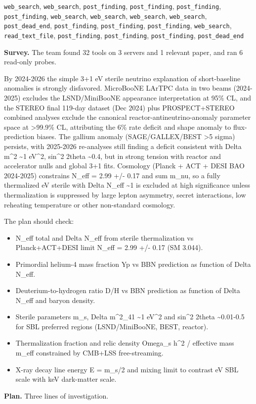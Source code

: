 \documentclass[11pt,a4paper]{article}
\begin{document}
\texttt{web\_search}, \texttt{web\_search}, \texttt{post\_finding}, \texttt{post\_finding}, \texttt{post\_finding}, \texttt{post\_finding}, \texttt{web\_search}, \texttt{web\_search}, \texttt{web\_search}, \texttt{web\_search}, \texttt{post\_dead\_end}, \texttt{post\_finding}, \texttt{post\_finding}, \texttt{post\_finding}, \texttt{web\_search}, \texttt{read\_text\_file}, \texttt{post\_finding}, \texttt{post\_finding}, \texttt{post\_finding}, \texttt{post\_dead\_end}\par
\textbf{Survey.} The team found 32 tools on 3 servers and 1 relevant paper, and ran 6 read-only probes.

By 2024-2026 the simple 3+1 eV sterile neutrino explanation of short-baseline anomalies is strongly disfavored. MicroBooNE LArTPC data in two beams (2024-2025) excludes the LSND/MiniBooNE appearance interpretation at 95\% CL, and the STEREO final 119-day dataset (Dec 2024) plus PROSPECT+STEREO combined analyses exclude the canonical reactor-antineutrino-anomaly parameter space at \textgreater{}99.9\% CL, attributing the 6\% rate deficit and shape anomaly to flux-prediction biases. The gallium anomaly (SAGE/GALLEX/BEST \textgreater{}5 sigma) persists, with 2025-2026 re-analyses still finding a deficit consistent with Delta m\textasciicircum{}2 \textasciitilde{}1 eV\textasciicircum{}2, sin\textasciicircum{}2 2theta \textasciitilde{}0.4, but in strong tension with reactor and accelerator nulls and global 3+1 fits. Cosmology (Planck + ACT + DESI BAO 2024-2025) constrains N\_eff = 2.99 +/- 0.17 and sum m\_nu, so a fully thermalized eV sterile with Delta N\_eff \textasciitilde{}1 is excluded at high significance unless thermalization is suppressed by large lepton asymmetry, secret interactions, low reheating temperature or other non-standard cosmology.

The plan should check:

\begin{itemize}
  \item N\_eff total and Delta N\_eff from sterile thermalization vs Planck+ACT+DESI limit N\_eff = 2.99 +/- 0.17 (SM 3.044).
  \item Primordial helium-4 mass fraction Yp vs BBN prediction as function of Delta N\_eff.
  \item Deuterium-to-hydrogen ratio D/H vs BBN prediction as function of Delta N\_eff and baryon density.
  \item Sterile parameters m\_s, Delta m\textasciicircum{}2\_41 \textasciitilde{}1 eV\textasciicircum{}2 and sin\textasciicircum{}2 2theta \textasciitilde{}0.01-0.5 for SBL preferred regions (LSND/MiniBooNE, BEST, reactor).
  \item Thermalization fraction and relic density Omega\_s h\textasciicircum{}2 / effective mass m\_eff constrained by CMB+LSS free-streaming.
  \item X-ray decay line energy E = m\_s/2 and mixing limit to contrast eV SBL scale with keV dark-matter scale.
\end{itemize}
\textbf{Plan.} Three lines of investigation.
\end{document}
